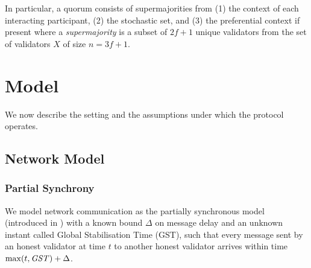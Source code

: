 In particular, a quorum consists of supermajorities from (1) the context of each interacting participant, (2) the stochastic set, and (3) the preferential context if present where a \emph{supermajority} is a subset of $2f+1$ unique validators from the set of validators $X$ of size $n=3f+1$.




\section{Model}
\label{sec:model}

We now describe the setting and the assumptions under which the protocol operates. 

\subsection{Network Model}
\subsubsection{Partial Synchrony}
We model network communication as the partially synchronous model (introduced in \cite{DLS88}) with a known bound $\Delta$ on message delay and an unknown instant called Global Stabilisation Time (GST), such that every message sent by an honest validator at time $t$ to another honest validator arrives within time $\max (t, \mathit{GST})+\Delta$. 
 
